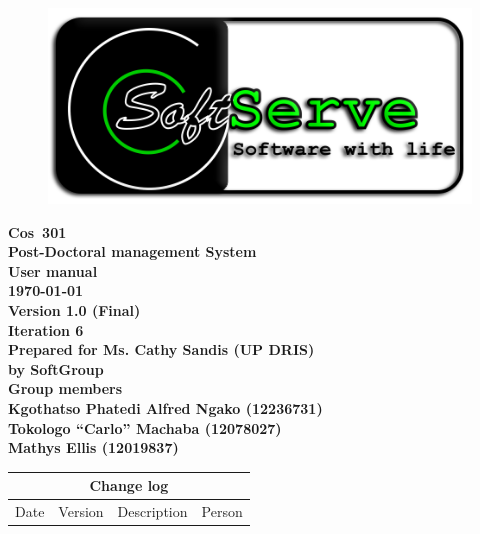\documentclass[12pt]{article}
\newcommand{\Title}{User manual} %
\newcommand{\Class}{Cos\ 301} %
\newcommand{\ssr}{Soft\color{green}{Serve }\color{black}}
\newcommand{\version}{1.0 (Final)}
\newcommand{\iteration}{6}
\newcommand{\client}{Ms. Cathy Sandis (UP DRIS)}
\newcommand{\project}{Post-Doctoral management System}
\begin{document}
\vspace{4em}

\begin{center}%

\begin{figure}[ht!]
\centering
\includegraphics{../Images_Docs/logo.png}
\end{figure}
\LARGE \bf \Class \\[0.25em]
\LARGE \bf \project \\[1em]
\LARGE \bf \Title \\[0.25em]
\large \bf \today\\
\bf Version \version\\
\bf Iteration \iteration\\[0.5em]
\Large \bf Prepared for \client\\
\Large \bf by
\Large {\bf \ssr Group }\\[0.5em]
\LARGE {\bf Group members}\\[0.25em]
\large
Kgothatso Phatedi Alfred Ngako (12236731) \\[0.5em]
Tokologo “Carlo” Machaba (12078027) \\[0.5em]
Mathys Ellis (12019837) \\[8em]

\end{center}%


\begin{center}
\begin{tabular}{|l|p{1.4cm}|p{8cm}|p{2.8cm}|}
\hline
\multicolumn{4}{|c|}{\bf Change log} \\
\hline
 Date & Version & Description &  Person \\
\hline


\end{tabular}
\end{center}
\newpage
\tableofcontents
\end{document}
